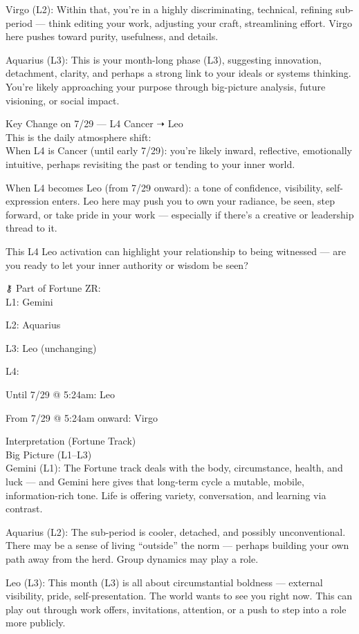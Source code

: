 \documentclass{article}
\begin{document}
Virgo (L2): Within that, you're in a highly discriminating, technical,
refining sub-period --- think editing your work, adjusting your craft,
streamlining effort. Virgo here pushes toward purity, usefulness, and
details.

Aquarius (L3): This is your month-long phase (L3), suggesting
innovation, detachment, clarity, and perhaps a strong link to your
ideals or systems thinking. You're likely approaching your purpose
through big-picture analysis, future visioning, or social impact.

Key Change on 7/29 --- L4 Cancer ➝ Leo\\
This is the daily atmosphere shift:\\
When L4 is Cancer (until early 7/29): you're likely inward, reflective,
emotionally intuitive, perhaps revisiting the past or tending to your
inner world.

When L4 becomes Leo (from 7/29 onward): a tone of confidence,
visibility, self-expression enters. Leo here may push you to own your
radiance, be seen, step forward, or take pride in your work ---
especially if there's a creative or leadership thread to it.

This L4 Leo activation can highlight your relationship to being
witnessed --- are you ready to let your inner authority or wisdom be
seen?

⚷ Part of Fortune ZR:\\
L1: Gemini

L2: Aquarius

L3: Leo (unchanging)

L4:

Until 7/29 @ 5:24am: Leo

From 7/29 @ 5:24am onward: Virgo

 Interpretation (Fortune Track)\\
Big Picture (L1--L3)\\
Gemini (L1): The Fortune track deals with the body, circumstance,
health, and luck --- and Gemini here gives that long-term cycle a
mutable, mobile, information-rich tone. Life is offering variety,
conversation, and learning via contrast.

Aquarius (L2): The sub-period is cooler, detached, and possibly
unconventional. There may be a sense of living ``outside'' the norm ---
perhaps building your own path away from the herd. Group dynamics may
play a role.

Leo (L3): This month (L3) is all about circumstantial boldness ---
external visibility, pride, self-presentation. The world wants to see
you right now. This can play out through work offers, invitations,
attention, or a push to step into a role more publicly.
\end{document}

